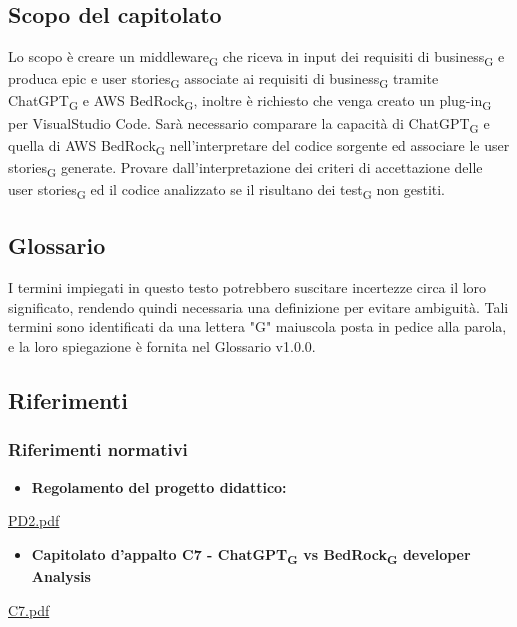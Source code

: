 \documentclass{article}
\begin{document}
\subsection{Scopo del capitolato}
Lo scopo è creare un middleware\textsubscript{G} che riceva in input dei requisiti di business\textsubscript{G} e produca epic e user stories\textsubscript{G} associate ai requisiti di business\textsubscript{G} tramite ChatGPT\textsubscript{G} e AWS BedRock\textsubscript{G}, inoltre è richiesto che venga creato un plug-in\textsubscript{G} per VisualStudio Code.
Sarà necessario comparare la capacità di ChatGPT\textsubscript{G} e quella di AWS BedRock\textsubscript{G} nell'interpretare del codice sorgente ed associare le user stories\textsubscript{G} generate. Provare dall'interpretazione dei criteri di accettazione delle user stories\textsubscript{G} ed il codice analizzato se il risultano dei test\textsubscript{G} non gestiti.

\subsection{Glossario}
I termini impiegati in questo testo potrebbero suscitare incertezze circa il loro significato, rendendo quindi necessaria una definizione per evitare ambiguità. Tali termini sono identificati da una lettera "G" maiuscola posta in pedice alla parola, e la loro spiegazione è fornita nel Glossario v1.0.0.

\subsection{Riferimenti}

\subsubsection{Riferimenti normativi}
\begin{itemize}
    \item \textbf{Regolamento del progetto didattico:}
\end{itemize}
\href{https://www.math.unipd.it/~tullio/IS-1/2023/Dispense/PD2.pdf}{PD2.pdf}
\begin{itemize}
    \item \textbf{Capitolato d'appalto C7 - ChatGPT\textsubscript{G} vs BedRock\textsubscript{G} developer Analysis}
\end{itemize}
\href{https://www.math.unipd.it/~tullio/IS-1/2023/Progetto/C7.pdf}{C7.pdf}
\end{document}
